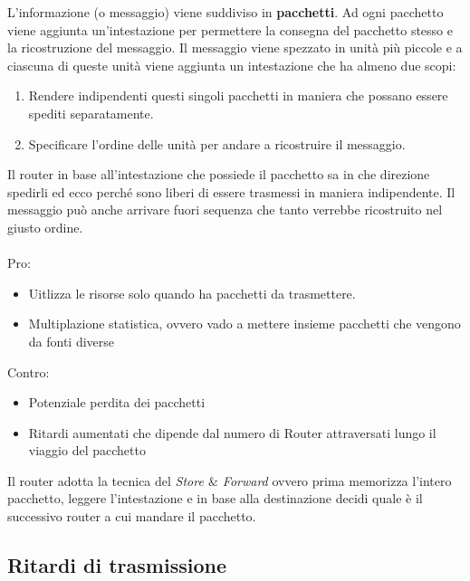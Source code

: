 \documentclass[a4paper]{article}
\begin{document}
L'informazione (o messaggio) viene suddiviso in \textbf{pacchetti}. Ad ogni pacchetto viene aggiunta un'intestazione per permettere la consegna del pacchetto stesso e la ricostruzione del messaggio. Il messaggio viene spezzato in unità più piccole e a ciascuna di queste unità viene aggiunta un intestazione che ha almeno due scopi:
\begin{enumerate}
    \item Rendere indipendenti questi singoli pacchetti in maniera che possano essere spediti separatamente. 
    \item Specificare l'ordine delle unità per andare a ricostruire il messaggio.
\end{enumerate}
Il router in base all'intestazione che possiede il pacchetto sa in che direzione spedirli ed ecco perché sono liberi di essere trasmessi in maniera indipendente. Il messaggio può anche arrivare fuori sequenza che tanto verrebbe ricostruito nel giusto ordine.
\\\\
Pro:
\begin{itemize}
    \item Uitlizza le risorse solo quando ha pacchetti da trasmettere. 
    \item Multiplazione statistica, ovvero vado a mettere insieme pacchetti che vengono da fonti diverse
\end{itemize}
Contro:
\begin{itemize}
    \item Potenziale perdita dei pacchetti 
    \item Ritardi aumentati che dipende dal numero di Router attraversati lungo il viaggio del pacchetto
\end{itemize}
Il router adotta la tecnica del \textit{Store $\&$ Forward} ovvero prima memorizza l'intero pacchetto, leggere l'intestazione e in base alla destinazione decidi quale è il successivo router a cui mandare il pacchetto. 

\subsection{Ritardi di trasmissione}
\end{document}
